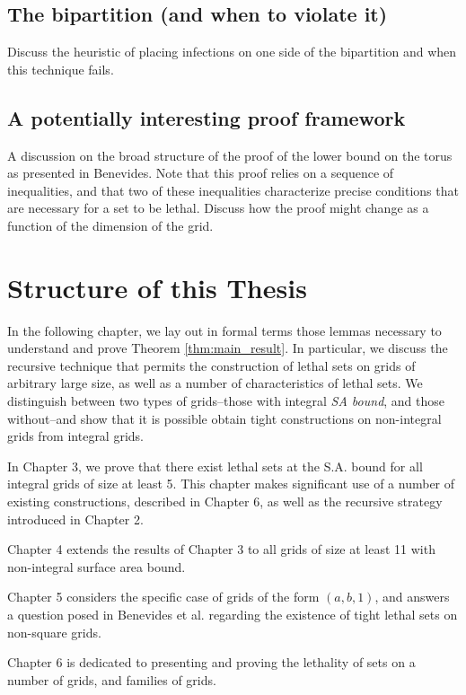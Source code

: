 \subsection{The bipartition (and when to violate it)}

Discuss the heuristic of placing infections on one side of the bipartition and when this technique fails. 

\subsection{A potentially interesting proof framework}

A discussion on the broad structure of the proof of the lower bound on the torus as presented in Benevides. Note that this proof relies on a sequence of inequalities, and that two of these inequalities characterize precise conditions that are necessary for a set to be lethal. Discuss how the proof might change as a function of the dimension of the grid. 

\section{Structure of this Thesis}

In the following chapter, we lay out in formal terms those lemmas necessary to understand and prove Theorem \ref{thm:main_result}. In particular, we discuss the recursive technique that permits the construction of lethal sets on grids of arbitrary large size, as well as a number of characteristics of lethal sets. We distinguish between two types of grids--those with integral \emph{SA bound}, and those without--and show that it is possible obtain tight constructions on non-integral grids from integral grids. 

In Chapter 3, we prove that there exist lethal sets at the S.A. bound for all integral grids of size at least 5. This chapter makes significant use of a number of existing constructions, described in Chapter 6, as well as the recursive strategy introduced in Chapter 2. 

Chapter 4 extends the results of Chapter 3 to all grids of size at least 11 with non-integral surface area bound. 

Chapter 5 considers the specific case of grids of the form $(a,b,1)$, and answers a question posed in Benevides et al. \cite{benevides:2022} regarding the existence of tight lethal sets on non-square grids. 

Chapter 6 is dedicated to presenting and proving the lethality of sets on a number of grids, and families of grids. 

